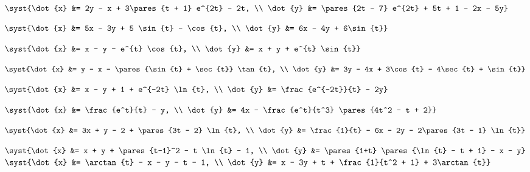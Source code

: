 \begin{multicols}{2}
\begin{enumtasks}
			\item \( \syst{\dot{x} &= 2y - x + 3\pares{t + 1} e^{2t} - 2t, \\ \dot{y} &= \pares{2t - 7} e^{2t} + 5t + 1 - 2x - 5y} \) %
			\item \( \syst{\dot{x} &= 5x - 3y + 5 \sin{t} - \cos{t}, \\ \dot{y} &= 6x - 4y + 6\sin{t}} \) %
			\item \( \syst{\dot{x} &= x - y - e^{t} \cos{t}, \\ \dot{y} &= x + y + e^{t} \sin{t}} \) %

			\label{linsys_nonhmg:general}
			\item \( \syst{\dot{x} &= y - x - \pares{\sin{t} + \sec{t}} \tan{t}, \\ \dot{y} &= 3y - 4x + 3\cos{t} - 4\sec{t} + \sin{t}} \) %
			\item \( \syst{\dot{x} &= x - y + 1 + e^{-2t} \ln{t}, \\ \dot{y} &= \frac{e^{-2t}}{t} - 2y} \) %
			\item \( \syst{\dot{x} &= \frac{e^t}{t} - y, \\ \dot{y} &= 4x - \frac{e^t}{t^3} \pares{4t^2 - t + 2}} \) %
			\item \( \syst{\dot{x} &= 3x + y - 2 + \pares{3t - 2} \ln{t}, \\ \dot{y} &= \frac{1}{t} - 6x - 2y - 2\pares{3t - 1} \ln{t}} \) %
			\item \( \syst{\dot{x} &= x + y + \pares{t-1}^2 - t \ln{t} - 1, \\ \dot{y} &= \pares{1+t} \pares{\ln{t} - t + 1} - x - y} \) %
			\itemstar \( \syst{\dot{x} &= \arctan{t} - x - y - t - 1, \\ \dot{y} &= x - 3y + t + \frac{1}{t^2 + 1} + 3\arctan{t}} \) %
			

\end{enumtasks}
\end{multicols}
